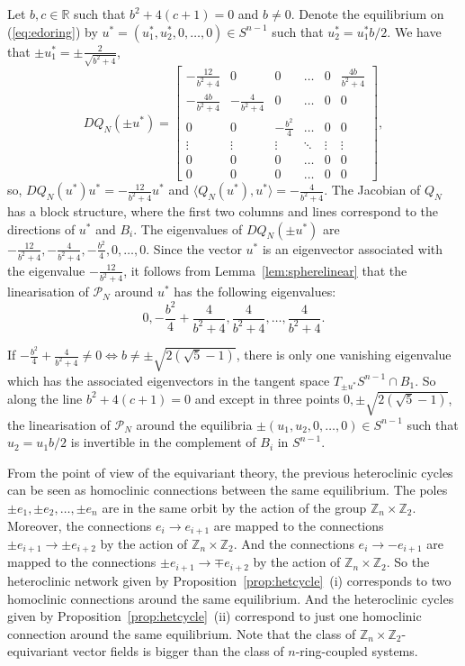 \documentclass{article}
\theoremstyle{definition}
\newenvironment{rem}
  {\pushQED{\qed}\renewcommand{\qedsymbol}{$\lozenge$}\remx}
  {\popQED\endremx}
\begin{document}
\begin{rem}
Let $b,c\in\mathbb{R}$ such that $b^2+4(c+1)=0$ and $b\neq 0$.  
Denote the equilibrium on (\ref{eq:edoring}) by  $u^*=(u_1^*,u_2^*,0,\dots,0)\in S^{n-1}$ such that $u_2^*=u_1^* b/2$.
We have that $\pm u_1^*= \pm\frac{2}{\sqrt{b^2+4}}$,  
$$DQ_N(\pm u^*)=\begin{bmatrix}
-\frac{12}{b^2+4}& 0 &0&\dots&0&\frac{4 b}{b^2+4}\\
-\frac{4 b}{b^2+4}& -\frac{4}{b^2+4} &0&\dots&0&0\\
0& 0 &-\frac{b^2}{4}&\dots&0&0\\
\vdots& \vdots &\vdots&\ddots&\vdots&\vdots\\
0& 0 &0&\dots&0&0\\
0& 0 &0&\dots&0&0
\end{bmatrix},$$
so, $DQ_N(u^*)u^*=-\frac{12}{b^2+4} u^* $ and $\langle Q_N(u^*),u^*\rangle=-\frac{4}{b^2+4}$.
The Jacobian of $Q_N$ has a block structure, where the first two columns and lines correspond to the directions of $u^*$ and $B_i$. The eigenvalues of $DQ_N(\pm u^*)$ are $-\frac{12}{b^2+4}, -\frac{4}{b^2+4}, -\frac{b^2}{4},0,\dots,0$.
Since the vector $u^*$ is an eigenvector associated with the eigenvalue $-\frac{12}{b^2+4}$, it follows from Lemma~\ref{lem:spherelinear} that the linearisation of $\mathcal{P}_N$ around $u^*$ has the following eigenvalues:
$$ 0, -\frac{b^2}{4}+\frac{4}{b^2+4},\frac{4}{b^2+4},\dots,\frac{4}{b^2+4}.$$

If $-\frac{b^2}{4}+\frac{4}{b^2+4}\neq 0\Leftrightarrow b\neq \pm \sqrt{2 \left(\sqrt{5}-1\right)}$, there is only one vanishing eigenvalue which has the associated eigenvectors in the tangent space $T_{\pm u^*} S^{n-1}\cap B_{1}$.
So along the line $b^2+4(c+1)=0$ and except in three points $0,\pm \sqrt{2 \left(\sqrt{5}-1\right)}$, the linearisation of $\mathcal{P}_N$ around the equilibria $\pm(u_1,u_2,0,\dots,0)\in S^{n-1}$ such that $u_2=u_1 b/2$ is invertible in the complement of $B_i$ in $S^{n-1}$.
\end{rem}






From the point of view of the equivariant theory, the previous heteroclinic cycles can be seen as homoclinic connections between the same equilibrium.
The poles $\pm e_1, \pm e_2, \dots, \pm e_n$ are in the same orbit by the action of the group $\mathbb{Z}_n\times \mathbb{Z}_2$. Moreover, the connections $e_i\rightarrow e_{i+1}$ are mapped to the connections $\pm e_{i+1}\rightarrow \pm e_{i+2}$ by the action of $\mathbb{Z}_n\times \mathbb{Z}_2$.
And the connections $e_i\rightarrow -e_{i+1}$ are mapped to the connections $\pm e_{i+1}\rightarrow \mp e_{i+2}$ by the action of $\mathbb{Z}_n\times \mathbb{Z}_2$.
So the heteroclinic network given by Proposition~\ref{prop:hetcycle}~(i) corresponds to two homoclinic connections around the same equilibrium.
And the heteroclinic cycles given by Proposition~\ref{prop:hetcycle}~(ii) correspond to just one homoclinic connection around the same equilibrium.
Note that the class of $\mathbb{Z}_n\times \mathbb{Z}_2$-equivariant vector fields is bigger than the class of $n$-ring-coupled systems.
\end{document}
